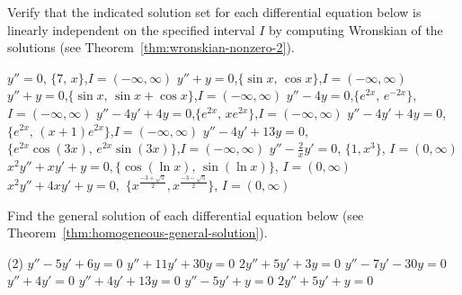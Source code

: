  
 \begin{Exercise}\label{EX32}
 	\vspace{-\baselineskip}%
 
 	\Question\label{3-2-1}
 		Verify that the indicated solution set for each  differential equation below  is linearly independent on the specified  interval $I$ by computing  Wronskian of the solutions (see Theorem~\ref{thm:wronskian-nonzero-2}). 
 		\begin{tasks}
 			\task\(y''=0\), \quad  \(\{7,\, x\}\),\quad  \(I=(-\infty,\infty)\)
 			\task \(y''+y=0\),\quad  \(\{\sin x,\, \cos x\}\),\quad \(I=(-\infty,\infty)\)
 			\task \(y''+y=0\),\quad  \(\{\sin x,\, \sin x+\cos x\}\),\quad \(I=(-\infty,\infty)\)
 			\task \(y''-4y=0\),\quad \(\{e^{2x},\, e^{-2x}\}\),\quad \(I=(-\infty,\infty)\)
 			\task \(y''-4y'+4y=0\),\quad \(\{e^{2x},\, xe^{2x}\}\),\quad \quad \(I=(-\infty,\infty)\)
 			\task  \(y''-4y'+4y=0\),\quad \(\{e^{2x},\, (x+1)e^{2x}\}\),\quad  \(I=(-\infty,\infty)\)
 			\task  \(y''-4y'+13y=0\),\quad \(\{e^{2x}\cos(3x),\, e^{2x}\sin(3x)\}\),\quad  \(I=(-\infty,\infty)\)
 			\task \(y''-\frac{2}{x}y'=0\), \quad \(\{1, x^3\}\), \quad \(I = (0, \infty)\)
 			\task \(x^2 y''+xy'+y = 0,\)\quad  \(\{\cos(\ln x),\, \sin(\ln x)\}\), \quad \(I = (0, \infty)\)
 			\task \(x^2 y''+4xy'+y = 0,\) \quad  \(\{x^{\frac{-3+ \sqrt{5}}{2}}, x^{\frac{-3- \sqrt{5}}{2}}\}\), \quad \(I = (0, \infty)\)
 		\end{tasks}
 	\Question\label{3-2-2}
 	Find the general solution of each differential equation below (see Theorem~\ref{thm:homogeneous-general-solution}).
 	\begin{tasks}(2)
 		\task \(y''-5y'+6y=0\)
 		\task \(y''+11y'+30y=0\)
 		\task \(2y''+5y'+3y=0\)
 		\task \(y''-7y'-30y=0\)
 		\task \(y''+4y'=0\)
 		\task \(y''+4y'+13y=0\)
 		\task \(y''-5y'+y=0\)
 		\task \(2y''+5y'+y=0\)
 	\end{tasks}
 	

\end{Exercise}
